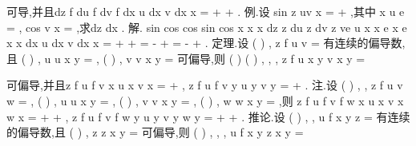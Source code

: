 可导,并且dz
f
du
f
dv
f
dx
u dx
v dx
x
\partial 
\partial 
\partial 
=
\cdots 
+
\cdots 
+
\partial 
\partial 
\partial . 
\textcolor{lyred}{例}.设
sin
z
uv
x
=
+
,其中
x
u
e
=
,
cos
v
x
=
,求dz
dx . 
解.
sin
cos
cos
sin
cos
x
x
x
dz
z du
z dv
z
ve
u
x
x
e
x
e
x
x
dx
u dx
v dx
x
\partial 
\partial 
\partial 
=
\cdots 
+
\cdots 
+
=
-
+
=
-
+
\partial 
\partial 
\partial 
. 
\textcolor{lyred}{定理}.设
(
)
,
z
f u v
=
有连续的偏导数,且
(
)
,
u
u x y
=
,
(
)
,
v
v x y
=
可偏导,则 
(
)
(
)
,
,
,
z
f u x y
v x y
=



可偏导,并且z
f
u
f
v
x
u
x
v
x
\partial 
\partial 
\partial 
\partial 
\partial 
=
\cdots 
+
\cdots 
\partial 
\partial 
\partial 
\partial 
\partial , z
f
u
f
v
y
u
y
v y
\partial 
\partial \partial 
\partial \partial 
=
+
\partial 
\partial 
\partial 
\partial \partial . 
\textcolor{lyred}{注}.设
(
)
, ,
z
f u v w
=
,
(
)
,
u
u x y
=
,
(
)
,
v
v x y
=
,
(
)
,
w
w x y
=
,则 
z
f
u
f
v
f
w
x
u
x
v
x
w
x
\partial 
\partial 
\partial 
\partial 
\partial 
\partial 
\partial 
=
\cdots 
+
\cdots 
+
\cdots 
\partial 
\partial 
\partial 
\partial 
\partial 
\partial 
\partial , z
f
u
f
v
f
w
y
u
y
v
y
w
y
\partial 
\partial 
\partial 
\partial 
\partial 
\partial 
\partial 
=
\cdots 
+
\cdots 
+
\cdots 
\partial 
\partial 
\partial 
\partial 
\partial 
\partial 
\partial 
. 
\textcolor{lyred}{推论}.设
(
)
, ,
u
f x y z
=
有连续的偏导数,且
(
)
,
z
z x y
=
可偏导,则 
(
)
, ,
,
u
f
x y z x y
=



